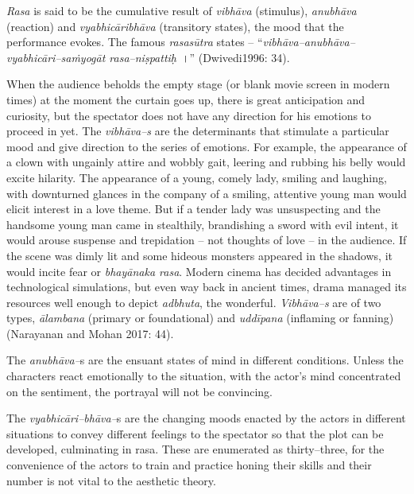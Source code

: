 \textit{Rasa} is said to be the cumulative result of \textit{vibhāva} (stimulus), \textit{anubhāva} (reaction) and \textit{vyabhicāribhāva} (transitory states), the mood that the performance evokes. The famous \textit{rasasūtra} states – “\textit{vibhāva–anubhāva–vyabhicāri–saṁyogāt rasa–niṣpattiḥ}~।” (Dwivedi1996: 34).

When the audience beholds the empty stage (or blank movie screen in modern times) at the moment the curtain goes up, there is great anticipation and curiosity, but the spectator does not have any direction for his emotions to proceed in yet. The \textit{vibhāva–s} are the determinants that stimulate a particular mood and give direction to the series of emotions. For example, the appearance of a clown with ungainly attire and wobbly gait, leering and rubbing his belly would excite hilarity. The appearance of a young, comely lady, smiling and laughing, with downturned glances in the company of a smiling, attentive young man would elicit interest in a love theme. But if a tender lady was unsuspecting and the handsome young man came in stealthily, brandishing a sword with evil intent, it would arouse suspense and trepidation – not thoughts of love – in the audience. If the scene was dimly lit and some hideous monsters appeared in the shadows, it would incite fear or \textit{bhayānaka rasa}. Modern cinema has decided advantages in technological simulations, but even way back in ancient times, drama managed its resources well enough to depict \textit{adbhuta}, the wonderful. \textit{Vibhāva–s }are of two types, \textit{ālambana} (primary or foundational) and \textit{uddīpana }(inflaming or fanning) (Narayanan and Mohan 2017: 44).

The \textit{anubhāva–}s are the ensuant states of mind in different conditions. Unless the characters react emotionally to the situation, with the actor’s mind concentrated on the sentiment, the portrayal will not be convincing.

The \textit{vyabhicāri–bhāva–}s are the changing moods enacted by the actors in different situations to convey different feelings to the spectator so that the plot can be developed, culminating in rasa. These are enumerated as thirty–three, for the convenience of the actors to train and practice honing their skills and their number is not vital to the aesthetic theory.

